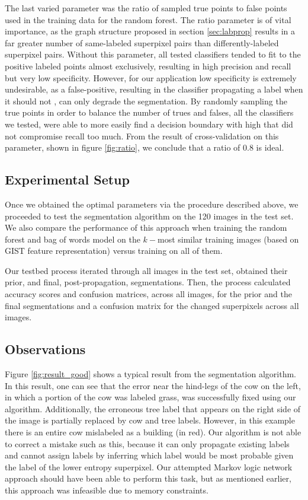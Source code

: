 \documentclass{article} %
\begin{document}
The last varied parameter was the ratio of sampled true points to false points used in the training data for the random forest.
The ratio parameter is of vital importance, as the graph structure proposed in section \ref{sec:labprop} results in a far greater number of same-labeled superpixel pairs than differently-labeled superpixel pairs.
Without this parameter, all tested classifiers tended to fit to the positive labeled points almost exclusively, resulting in high precision and recall but very low specificity. 
However, for our application low specificity is extremely undesirable, as a false-positive, resulting in the classifier propagating a label when it should not , can only degrade the segmentation. By randomly sampling the true points in order to balance the number of trues and falses, all the classifiers we tested, were able to more easily find a decision boundary with high that did not compromise recall too much.  
From the result of cross-validation on this parameter, shown in figure \ref{fig:ratio}, we conclude that a ratio of 0.8 is ideal.


\subsection{Experimental Setup}

Once we obtained the optimal parameters via the procedure described above, we proceeded to test the segmentation algorithm on the 120 images in the test set. We also compare the performance of this approach when training the random forest and bag of words model on the $k-$most similar training images (based on GIST feature representation) versus training on all of them.

Our testbed process iterated through all images in the test set, obtained their prior, and final, post-propagation, segmentations. Then, the process calculated accuracy scores and confusion matrices, across all images, for the prior and the final segmentations and a confusion matrix for the changed superpixels across all images. 

\subsection{Observations}
\label{sec:Observations}

Figure \ref{fig:result_good} shows a typical result from the segmentation algorithm. In this result, one can see that the error near the hind-legs of the cow on the left, in which a portion of the cow was labeled grass, was successfully fixed using our algorithm. Additionally, the erroneous tree label that appears on the right side of the image is partially replaced by cow and tree labels. However, in this example there is an entire cow mislabeled as a building (in red). Our algorithm is not able to correct a mistake such as this, because it can only propagate existing labels and cannot assign labels by inferring which label would be most probable given the label of the lower entropy superpixel. Our attempted Markov logic network approach should have been able to perform this task, but as mentioned earlier, this approach was infeasible due to memory constraints.
\end{document}

